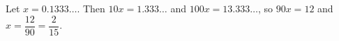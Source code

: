 Let $x=0.1333\ldots$. Then $10x=1.333\ldots$ and $100x=13.333\ldots$, so $90x=12$ and $x=\dfrac{12}{90}=\boxed{\dfrac2{15}}$.
